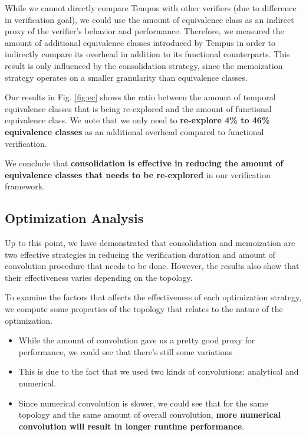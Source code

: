 While we cannot directly compare Tempus with other verifiers (due to difference in verification goal), 
we could use the amount of equivalence class as an indirect proxy of the verifier's behavior and performance.
Therefore, we measured the amount of additional equivalence classes introduced by Tempus in order to 
indirectly compare its overhead in addition to its functional counterparts.
This result is only influenced by the consolidation strategy, since the memoization strategy operates on 
a smaller granularity than equivalence classes.

Our results in Fig. \ref{fig:ec} shows the ratio between the amount of temporal equivalence classes that is 
being re-explored and the amount of functional equivalence class.
We note that we only need to \textbf{re-explore 4\% to 46\% equivalence classes} as an additional overhead 
compared to functional verification.

We conclude that \textbf{consolidation is effective in reducing the amount of equivalence classes that 
needs to be re-explored} in our verification framework.

\subsection{Optimization Analysis}

Up to this point, we have demonstrated that consolidation and memoization are two effective strategies in 
reducing the verification duration and amount of convolution procedure that needs to be done.
However, the results also show that their effectiveness varies depending on the topology.

To examine the factors that affects the effectiveness of each optimization strategy, we compute some properties 
of the topology that relates to the nature of the optimization.


\begin{itemize}
    \item While the amount of convolution gave us a pretty good proxy for performance, we could see 
        that there's still some variations
    \item This is due to the fact that we used two kinds of convolutions: analytical and numerical.
    \item Since numerical convolution is slower, we could see that for the same topology and the same amount of 
        overall convolution, \textbf{more numerical convolution will result in longer runtime performance}.
\end{itemize}

